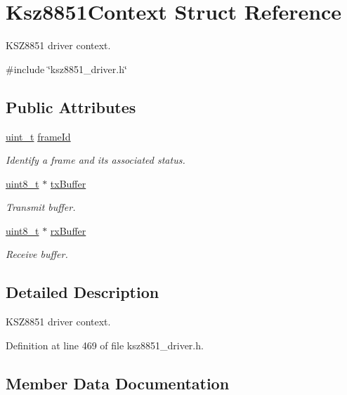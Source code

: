 \hypertarget{structKsz8851Context}{}\section{Ksz8851\+Context Struct Reference}
\label{structKsz8851Context}


K\+S\+Z8851 driver context.  




{\ttfamily \#include \char`\"{}ksz8851\+\_\+driver.\+h\char`\"{}}

\subsection*{Public Attributes}
\begin{DoxyCompactItemize}
\item 
\hyperlink{compiler__port_8h_a12a1e9b3ce141648783a82445d02b58d}{uint\+\_\+t} \hyperlink{structKsz8851Context_a424b2fc6743cfc3c31cf59164610ee89}{frame\+Id}
\begin{DoxyCompactList}\small\item\em Identify a frame and its associated status. \end{DoxyCompactList}\item 
\hyperlink{stdint_8h_aba7bc1797add20fe3efdf37ced1182c5}{uint8\+\_\+t} $\ast$ \hyperlink{structKsz8851Context_a9eef3244c4dcc6554dc1e8a0243491eb}{tx\+Buffer}
\begin{DoxyCompactList}\small\item\em Transmit buffer. \end{DoxyCompactList}\item 
\hyperlink{stdint_8h_aba7bc1797add20fe3efdf37ced1182c5}{uint8\+\_\+t} $\ast$ \hyperlink{structKsz8851Context_aedfff3a17d92a82fb7bd5ce91ef8d865}{rx\+Buffer}
\begin{DoxyCompactList}\small\item\em Receive buffer. \end{DoxyCompactList}\end{DoxyCompactItemize}


\subsection{Detailed Description}
K\+S\+Z8851 driver context. 

Definition at line 469 of file ksz8851\+\_\+driver.\+h.



\subsection{Member Data Documentation}
\mbox{\label{structKsz8851Context_a424b2fc6743cfc3c31cf59164610ee89}} 

